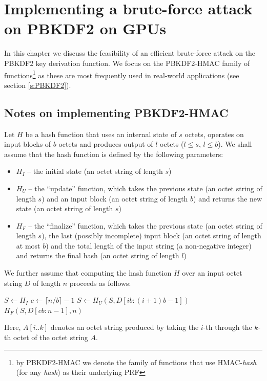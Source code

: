 \documentclass[12pt,oneside]{fithesis2}
\begin{document}
    \chapter{Implementing a brute-force attack on PBKDF2 on GPUs}
      In this chapter we discuss the feasibility of an efficient brute-force attack on the PBKDF2 key derivation function. We focus on the PBKDF2-HMAC family of functions\footnote{by PBKDF2-HMAC we denote the family of functions that use HMAC-\emph{hash} (for any \emph{hash}) as their underlying PRF} as these are most frequently used in real-world applications (see section \ref{s:PBKDF2}).
      
      \section{Notes on implementing PBKDF2-HMAC}
      Let $H$ be a hash function that uses an internal state of $s$ octets, operates on input blocks of $b$ octets and produces output of $l$ octets ($l \le s$, $l \le b$). We shall assume that the hash function is defined by the following parameters:
      \begin{itemize}
        \item $H_I$ -- the initial state (an octet string of length $s$)
        \item $H_U$ -- the ``update'' function, which takes the previous state (an octet string of length $s$) and an input block (an octet string of length $b$) and returns the new state (an octet string of length $s$)
        \item $H_F$ -- the ``finalize'' function, which takes the previous state (an octet string of length $s$), the last (possibly incomplete) input block (an octet string of length at most $b$) and the total length of the input string (a non-negative integer) and returns the final hash (an octet string of length $l$)
      \end{itemize}
      We further assume that computing the hash function $H$ over an input octet string $D$ of length $n$ proceeds as follows:
      \begin{algorithmic}[1]
          \State $S \gets H_I$
          \State $c \gets \lceil n / b \rceil - 1$
            \State $S \gets H_U(S, D[ib:(i+1)b-1])$
          \EndFor
          \State \Return $H_F(S, D[cb:n-1], n)$
        \EndFunction
      \end{algorithmic}
      
      Here, $A[i..k]$ denotes an octet string produced by taking the $i$-th through the $k$-th octet of the octet string $A$.
      
\end{document}
